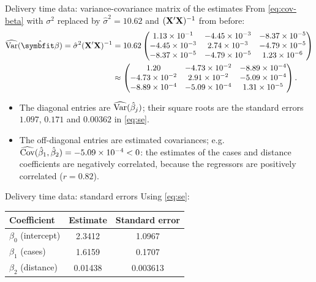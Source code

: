 \begin{frame}{Delivery time data: variance-covariance matrix of the estimates}
    From \eqref{eq:cov-beta} with $\sigma^2$ replaced by $\hat\sigma^2=10.62$ and $(\mathbf{X}'\mathbf{X})^{-1}$ from before:
    \footnotesize
    \setlength{\arraycolsep}{3pt}
    \begin{align*}
        \widehat{\Var}(\hat{\bbeta}) = \hat\sigma^2(\bX'\bX)^{-1}
        &= 10.62
        \begin{pmatrix}
            1.13\times10^{-1} & -4.45\times10^{-3} & -8.37\times10^{-5} \\
            -4.45\times10^{-3} & 2.74\times10^{-3} & -4.79\times10^{-5} \\
            -8.37\times10^{-5} & -4.79\times10^{-5} & 1.23\times10^{-6}
        \end{pmatrix} \\
        &\approx
        \begin{pmatrix}
            1.20 & -4.73\times10^{-2} & -8.89\times10^{-4} \\
            -4.73\times10^{-2} & 2.91\times10^{-2} & -5.09\times10^{-4} \\
            -8.89\times10^{-4} & -5.09\times10^{-4} & 1.31\times10^{-5}
        \end{pmatrix}.
    \end{align*}
    \normalsize
    \begin{itemize}
        \item The diagonal entries are $\widehat{\operatorname{Var}}(\hat\beta_j)$; their square roots are the standard errors $1.097$, $0.171$ and $0.00362$ in \eqref{eq:se}.
        \item The off-diagonal entries are estimated covariances; e.g.\ $\widehat{\operatorname{Cov}}(\hat\beta_1,\hat\beta_2)=-5.09\times10^{-4}<0$: the estimates of the cases and distance coefficients are negatively correlated, because the regressors are positively correlated ($r=0.82$).
    \end{itemize}
\end{frame}


\begin{frame}{Delivery time data: standard errors}
    Using \eqref{eq:se}:
    \begin{center}
        \begin{tabular}{lcc}
            \toprule
            Coefficient & Estimate & Standard error \\
            \midrule
            $\beta_0$ (intercept) & 2.3412  & 1.0967 \\
            $\beta_1$ (cases)     & 1.6159  & 0.1707 \\
            $\beta_2$ (distance)  & 0.01438 & 0.003613 \\
            \bottomrule
        \end{tabular}
    \end{center}
\end{frame}


